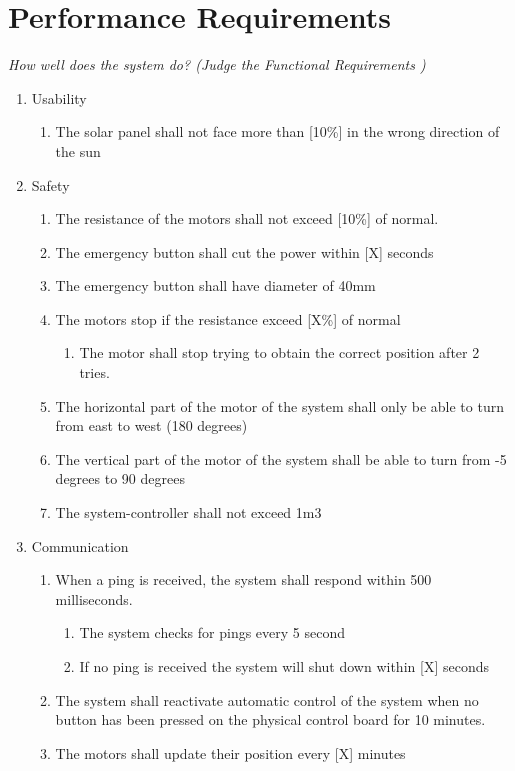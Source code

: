 \documentclass[12pt,a4paper]{report}
\begin{document}
\section{Performance Requirements}
\textit{How well does the system do? (Judge the Functional Requirements )}
\begin{enumerate}
\item	Usability
\begin{enumerate}
	\item	The solar panel shall not face more than [10\%] in the wrong direction of the sun
\end{enumerate}
\item	Safety
\begin{enumerate}
	\item	The resistance of the motors shall not exceed [10\%] of normal.
	\item	The emergency button shall cut the power within [X] seconds
	\item	The emergency button shall have diameter of 40mm
	\item	The motors stop if the resistance exceed [X\%] of normal
	\begin{enumerate}
		\item	The motor shall stop trying to obtain the correct position after 2 tries.
		\end{enumerate}
	\item	The horizontal part of the motor of the system shall only be able to turn from east to west (180 degrees)
	\item	The vertical part of the motor of the system shall be able to turn from -5 degrees to 90 degrees
	\item	The system-controller shall not exceed 1m3
\end{enumerate}
\item	Communication
\begin{enumerate}
	\item	When a ping is received, the system shall respond within 500 milliseconds.
	\begin{enumerate}
		\item	The system checks for pings every 5 second
		\item	If no ping is received the system will shut down within [X] seconds
	\end{enumerate}
	\item	The system shall reactivate automatic control of the system when no button has been pressed on the physical control board for 10 minutes.
	\item	The motors shall update their position every [X] minutes

\end{enumerate}
\end{enumerate}
\end{document}
